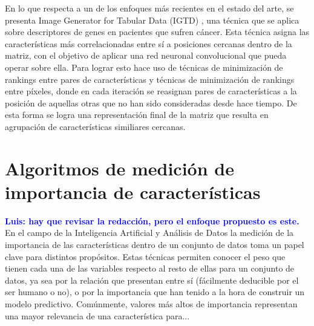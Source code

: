 \documentclass{uathesis-es}
\begin{document}
En lo que respecta a un de los enfoques más recientes en el estado del arte, se presenta Image Generator for Tabular Data (IGTD) \cite{Zhu2021}, una técnica que se aplica sobre descriptores de genes en pacientes que sufren cáncer. Esta técnica asigna las características más correlacionadas entre sí a posiciones cercanas dentro de la matriz, con el objetivo de aplicar una red neuronal convolucional que pueda operar sobre ella. Para lograr esto hace uso de técnicas de minimización de rankings entre pares de características y técnicas de minimización de rankings entre píxeles, donde en cada iteración se reasignan pares de características a la posición de aquellas otras que no han sido consideradas desde hace tiempo. De esta forma se logra una representación final de la matriz que resulta en agrupación de características similiares cercanas.


\section{Algoritmos de medición de importancia de características}
\label{SOAT_FEATURE_IMPORTANCE_METHODS}

\textcolor{blue}{\textbf{Luis: hay que revisar la redacción, pero el enfoque propuesto es este.}}\\


En el campo de la Inteligencia Artificial y Análisis de Datos la medición de la importancia de las características dentro de un conjunto de datos toma un papel clave para distintos propósitos. Estas técnicas permiten conocer el peso que tienen cada una de las variables respecto al resto de ellas para un conjunto de datos, ya sea por la relación que presentan entre sí (fácilmente deducible por el ser humano o no), o por la importancia que han tenido a la hora de construir un modelo predictivo. Comúnmente, valores más altos de importancia representan una mayor relevancia de una característica para...
\end{document}
